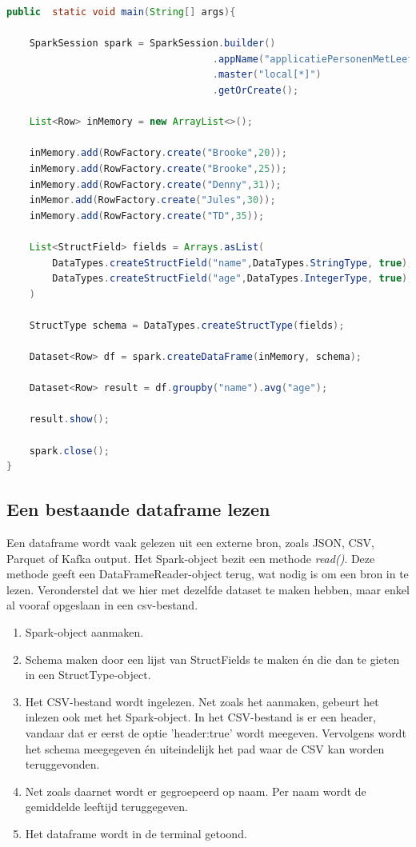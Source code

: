 \documentclass[a4paper,10pt,twoside]{report}
\begin{document}
\begin{lstlisting}[language=Java]
public	static void main(String[] args){
	
	SparkSession spark = SparkSession.builder()
									.appName("applicatiePersonenMetLeeftijd")
									.master("local[*]")
									.getOrCreate();
									
	List<Row> inMemory = new ArrayList<>();
	
	inMemory.add(RowFactory.create("Brooke",20));
	inMemory.add(RowFactory.create("Brooke",25));
	inMemory.add(RowFactory.create("Denny",31));
	inMemor.add(RowFactory.create("Jules",30));
	inMemory.add(RowFactory.create("TD",35));
	
	List<StructField> fields = Arrays.asList(
		DataTypes.createStructField("name",DataTypes.StringType, true),
		DataTypes.createStructField("age",DataTypes.IntegerType, true);
	)
	
	StructType schema = DataTypes.createStructType(fields);
	
	Dataset<Row> df = spark.createDataFrame(inMemory, schema);

	Dataset<Row> result = df.groupby("name").avg("age");
	
	result.show();
	
	spark.close();
}
\end{lstlisting}

\subsection{Een bestaande dataframe lezen}

Een dataframe wordt vaak gelezen uit een externe bron, zoals JSON, CSV, Parquet of Kafka output. Het Spark-object bezit een methode \textit{read()}. Deze methode geeft een DataFrameReader-object terug, wat nodig is om een bron in te lezen. Veronderstel dat we hier met dezelfde dataset te maken hebben, maar enkel al vooraf opgeslaan in een csv-bestand.

\begin{enumerate}
	\item Spark-object aanmaken.
	\item Schema maken door een lijst van StructFields te maken én die dan te gieten in een StructType-object.
	\item Het CSV-bestand wordt ingelezen. Net zoals het aanmaken, gebeurt het inlezen ook met het Spark-object. In het CSV-bestand is er een header, vandaar dat er eerst de optie 'header:true' wordt meegeven. Vervolgens wordt het schema meegegeven én uiteindelijk het pad waar de CSV kan worden teruggevonden.
	\item Net zoals daarnet wordt er gegroepeerd op naam. Per naam wordt de gemiddelde leeftijd teruggegeven.
	\item Het dataframe wordt in de terminal getoond.
\end{enumerate}
\end{document}
